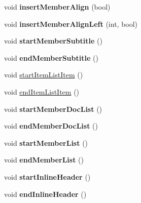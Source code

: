 \begin{DoxyCompactItemize}
\item 
\mbox{\label{class_man_generator_a7304b66d658ba124c84d4553772f27a6}} 
void {\bfseries insert\+Member\+Align} (bool)
\item 
\mbox{\label{class_man_generator_ad21762ee94c16bed4a40dc1a439e7237}} 
void {\bfseries insert\+Member\+Align\+Left} (int, bool)
\item 
\mbox{\label{class_man_generator_a8401b5bb326a6aeea489f930cdbd6b73}} 
void {\bfseries start\+Member\+Subtitle} ()
\item 
\mbox{\label{class_man_generator_a2338bc0695c2c43e905266bd6178db98}} 
void {\bfseries end\+Member\+Subtitle} ()
\item 
void \mbox{\hyperlink{class_man_generator_a83d776971ea058ea021d49df05f4e563}{start\+Item\+List\+Item}} ()
\item 
void \mbox{\hyperlink{class_man_generator_a87a722d58e6364660622ab086f20edc8}{end\+Item\+List\+Item}} ()
\item 
\mbox{\label{class_man_generator_a94d12a8dc22ce00643f7bec9e0362029}} 
void {\bfseries start\+Member\+Doc\+List} ()
\item 
\mbox{\label{class_man_generator_afc88f71ad193093bf9e390e3c42599de}} 
void {\bfseries end\+Member\+Doc\+List} ()
\item 
\mbox{\label{class_man_generator_a364cef63b278c64d8a3b9b6db37395cb}} 
void {\bfseries start\+Member\+List} ()
\item 
\mbox{\label{class_man_generator_a0ee830ccc307c8123fffe69bd869ee41}} 
void {\bfseries end\+Member\+List} ()
\item 
\mbox{\label{class_man_generator_aa3087d26fc36bd95bebf71f9a92fa404}} 
void {\bfseries start\+Inline\+Header} ()
\item 
\mbox{\label{class_man_generator_aca092428ce78c39b6a3a6e1e8fc66769}} 
void {\bfseries end\+Inline\+Header} ()
\item 

\end{DoxyCompactItemize}
